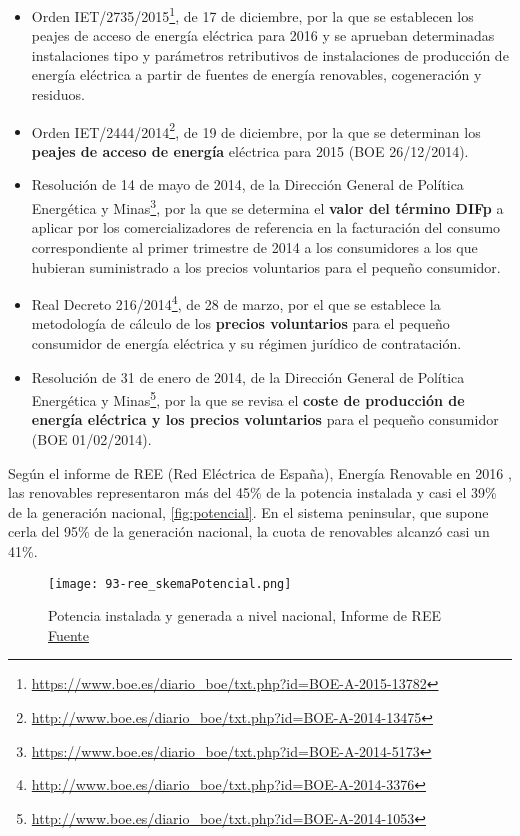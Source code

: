 \begin{itemize}
\item
  Orden IET/2735/2015\footnote{\url{https://www.boe.es/diario_boe/txt.php?id=BOE-A-2015-13782}}, de 17 de diciembre, por la que se establecen los
  peajes de acceso de energía eléctrica para 2016 y se aprueban
  determinadas instalaciones tipo y parámetros retributivos de
  instalaciones de producción de energía eléctrica a partir de fuentes
  de energía renovables, cogeneración y residuos.
\item
  Orden IET/2444/2014\footnote{\url{http://www.boe.es/diario_boe/txt.php?id=BOE-A-2014-13475}}, de 19 de diciembre, por la que se determinan los
  \textbf{peajes de acceso de energía} eléctrica para 2015 (BOE
  26/12/2014).
\item
  Resolución
  de 14 de mayo de 2014, de la Dirección General de Política Energética
  y Minas\footnote{\url{https://www.boe.es/diario_boe/txt.php?id=BOE-A-2014-5173}}, por la que se determina el \textbf{valor del término DIFp} a
  aplicar por los comercializadores de referencia en la facturación del
  consumo correspondiente al primer trimestre de 2014 a los consumidores
  a los que hubieran suministrado a los precios voluntarios para el
  pequeño consumidor.
\item
  Real
  Decreto 216/2014\footnote{\url{http://www.boe.es/diario_boe/txt.php?id=BOE-A-2014-3376}}, de 28 de marzo, por el que se establece la
  metodología de cálculo de los \textbf{precios voluntarios} para el
  pequeño consumidor de energía eléctrica y su régimen jurídico de
  contratación.
\item
  Resolución
  de 31 de enero de 2014, de la Dirección General de Política Energética
  y Minas\footnote{\url{http://www.boe.es/diario_boe/txt.php?id=BOE-A-2014-1053}}, por la que se revisa el \textbf{coste de producción de
  energía eléctrica y los precios voluntarios} para el pequeño
  consumidor (BOE 01/02/2014).
\end{itemize}

Según el informe de REE (Red Eléctrica de España), Energía
Renovable en 2016 \cite{ree}, las renovables representaron más del 45\% de la
potencia instalada y casi el 39\% de la generación nacional, \autoref{fig:potencial}. En el
sistema peninsular, que supone cerla del 95\% de la generación nacional,
la cuota de renovables alcanzó casi un 41\%.

\begin{figure}
\centering
\texttt{[image: 93-ree\_skemaPotencial.png]}
\caption[Potencia instalada y generada a nivel nacional]{Potencia instalada y generada a nivel nacional, Informe de REE \href{http://www.ree.es/es/estadisticas-del-sistema-electrico-espanol/informe-de-energias-renovables}{Fuente}}
\label{fig:potencial}
\end{figure}

